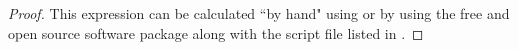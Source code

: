 \begin{proof}
This expression can be calculated ``by hand" using 
or by using the free and open source software package 
along with the script file listed in .
\end{proof}


